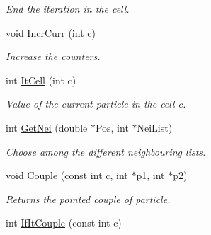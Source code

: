 \begin{DoxyCompactItemize}
\begin{DoxyCompactList}\small\item\em \-End the iteration in the cell. \end{DoxyCompactList}\item 
\hypertarget{classDdFixedSize_af5859063d6fe309152f039205b16014e}{void \hyperlink{classDdFixedSize_af5859063d6fe309152f039205b16014e}{\-Incr\-Curr} (int c)}\label{classDdFixedSize_af5859063d6fe309152f039205b16014e}

\begin{DoxyCompactList}\small\item\em \-Increase the counters. \end{DoxyCompactList}\item 
\hypertarget{classDdFixedSize_a1fb1ab9e4e4c98b9860711fdb1fba3b4}{int \hyperlink{classDdFixedSize_a1fb1ab9e4e4c98b9860711fdb1fba3b4}{\-It\-Cell} (int c)}\label{classDdFixedSize_a1fb1ab9e4e4c98b9860711fdb1fba3b4}

\begin{DoxyCompactList}\small\item\em \-Value of the current particle in the cell c. \end{DoxyCompactList}\item 
\hypertarget{classDdFixedSize_afe0e4e9746cdae570f8c1efdfd04ac16}{int \hyperlink{classDdFixedSize_afe0e4e9746cdae570f8c1efdfd04ac16}{\-Get\-Nei} (double $\ast$\-Pos, int $\ast$\-Nei\-List)}\label{classDdFixedSize_afe0e4e9746cdae570f8c1efdfd04ac16}

\begin{DoxyCompactList}\small\item\em \-Choose among the different neighbouring lists. \end{DoxyCompactList}\item 
\hypertarget{classDdFixedSize_aabccb7f79ac6e104734750f00fa72b76}{void \hyperlink{classDdFixedSize_aabccb7f79ac6e104734750f00fa72b76}{\-Couple} (const int c, int $\ast$p1, int $\ast$p2)}\label{classDdFixedSize_aabccb7f79ac6e104734750f00fa72b76}

\begin{DoxyCompactList}\small\item\em \-Returns the pointed couple of particle. \end{DoxyCompactList}\item 
\hypertarget{classDdFixedSize_a3896db13faf370f18b2a70c6acd01930}{int \hyperlink{classDdFixedSize_a3896db13faf370f18b2a70c6acd01930}{\-If\-It\-Couple} (const int c)}\label{classDdFixedSize_a3896db13faf370f18b2a70c6acd01930}


\end{DoxyCompactItemize}
